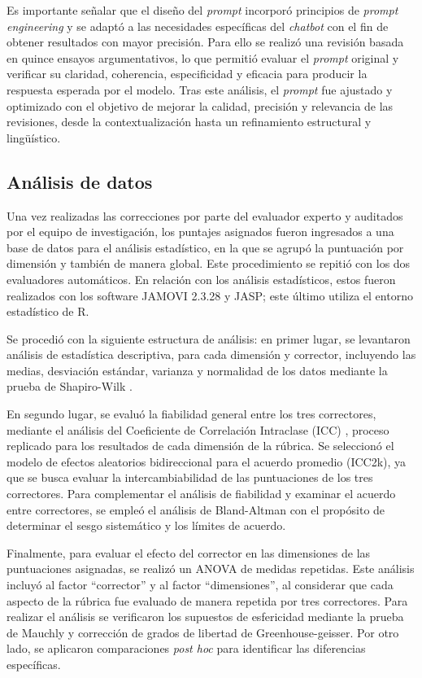 \documentclass[spanish]{textolivre}
\begin{document}
Es importante señalar que el diseño del \textit{prompt} incorporó principios de \textit{prompt engineering} y se adaptó a las necesidades específicas del \textit{chatbot} con el fin de obtener resultados con mayor precisión. Para ello se realizó una revisión basada en quince ensayos argumentativos, lo que permitió evaluar el \textit{prompt} original y verificar su claridad, coherencia, especificidad y eficacia para producir la respuesta esperada por el modelo. Tras este análisis, el \textit{prompt} fue ajustado y optimizado con el objetivo de mejorar la calidad, precisión y relevancia de las revisiones, desde la contextualización hasta un refinamiento estructural y lingüístico.

\subsection{Análisis de datos}
Una vez realizadas las correcciones por parte del evaluador experto y auditados por el equipo de investigación, los puntajes asignados fueron ingresados a una base de datos para el análisis estadístico, en la que se agrupó la puntuación por dimensión y también de manera global. Este procedimiento se repitió con los dos evaluadores automáticos. En relación con los análisis estadísticos, estos fueron realizados con los software JAMOVI 2.3.28 y JASP; este último utiliza el entorno estadístico de R.

Se procedió con la siguiente estructura de análisis: en primer lugar, se levantaron análisis de estadística descriptiva, para cada dimensión y corrector, incluyendo las medias, desviación estándar, varianza y normalidad de los datos mediante la prueba de Shapiro-Wilk \cite{razali2011}.

En segundo lugar, se evaluó la fiabilidad general entre los tres correctores, mediante el análisis del Coeficiente de Correlación Intraclase (ICC) \cite{shrout1979, koo2016}, proceso replicado para los resultados de cada dimensión de la rúbrica. Se seleccionó el modelo de efectos aleatorios bidireccional para el acuerdo promedio (ICC2k), ya que se busca evaluar la intercambiabilidad de las puntuaciones de los tres correctores. Para complementar el análisis de fiabilidad y examinar el acuerdo entre correctores, se empleó el análisis de Bland-Altman \cite{giavarina2015} con el propósito de determinar el sesgo sistemático y los límites de acuerdo.

Finalmente, para evaluar el efecto del corrector en las dimensiones de las puntuaciones asignadas, se realizó un ANOVA de medidas repetidas. Este análisis incluyó al factor ``corrector'' y al factor ``dimensiones'', al considerar que cada aspecto de la rúbrica fue evaluado de manera repetida por tres correctores.  Para realizar el análisis se verificaron los supuestos de esfericidad mediante la prueba de Mauchly y corrección de grados de libertad de Greenhouse-geisser. Por otro lado, se aplicaron comparaciones \textit{post hoc} para identificar las diferencias específicas.
\end{document}

